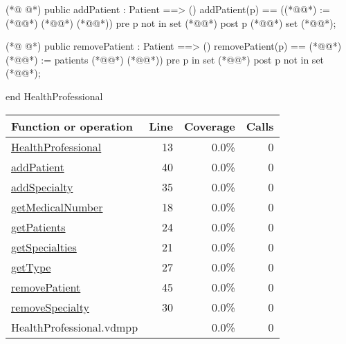 \begin{vdmpp}[breaklines=true]
(*@
\label{addPatient:40}
@*)
 public addPatient : Patient ==> ()
  addPatient(p) == ((*@@*) :=  (*@@*) (*@@*) {(*@@*)})
 pre p not in set (*@@*)
 post p (*@@*) set (*@@*);
 
(*@
\label{removePatient:45}
@*)
 public removePatient : Patient ==> ()
  removePatient(p) == (*@\vdmnotcovered{(}@*)(*@@*) := patients (*@\vdmnotcovered{\textbackslash }@*) {(*@@*)})
 pre p in set (*@@*)
 post p not in set (*@@*);

end HealthProfessional
\end{vdmpp}
\bigskip
\begin{longtable}{|l|r|r|r|}
\hline
Function or operation & Line & Coverage & Calls \\
\hline
\hline
\hyperref[HealthProfessional:13]{HealthProfessional} & 13&0.0\% & 0 \\
\hline
\hyperref[addPatient:40]{addPatient} & 40&0.0\% & 0 \\
\hline
\hyperref[addSpecialty:35]{addSpecialty} & 35&0.0\% & 0 \\
\hline
\hyperref[getMedicalNumber:18]{getMedicalNumber} & 18&0.0\% & 0 \\
\hline
\hyperref[getPatients:24]{getPatients} & 24&0.0\% & 0 \\
\hline
\hyperref[getSpecialties:21]{getSpecialties} & 21&0.0\% & 0 \\
\hline
\hyperref[getType:27]{getType} & 27&0.0\% & 0 \\
\hline
\hyperref[removePatient:45]{removePatient} & 45&0.0\% & 0 \\
\hline
\hyperref[removeSpecialty:30]{removeSpecialty} & 30&0.0\% & 0 \\
\hline
\hline
HealthProfessional.vdmpp & & 0.0\% & 0 \\
\hline
\end{longtable}


